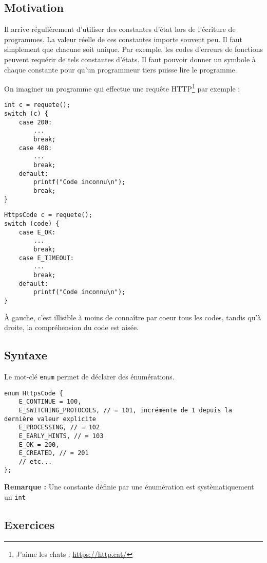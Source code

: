 \documentclass[../../../main.tex]{subfiles}
\begin{document}
\subsection{Motivation}
Il arrive régulièrement d'utiliser des constantes d'état lors de l'écriture de programmes. La valeur réelle de ces constantes importe souvent peu. Il faut simplement que chacune soit unique. Par exemple, les codes d'erreurs de fonctions peuvent requérir de tels constantes d'états. 
Il faut pouvoir donner un symbole à chaque constante pour qu'un programmeur tiers puisse lire le programme.

On imaginer un programme qui effectue une requête HTTP\footnote{J'aime les chats : \url{https://http.cat/}} par exemple :

\begin{minipage}{0.5\textwidth}
\begin{verbatim}
int c = requete();
switch (c) {
	case 200:
		...
		break;
	case 408:
		...
		break;
	default:
		printf("Code inconnu\n");
		break;
}
\end{verbatim}
\end{minipage}
\begin{minipage}{0.5\textwidth}
\begin{verbatim}
HttpsCode c = requete();
switch (code) {
	case E_OK:
		...
		break;
	case E_TIMEOUT:
		...
		break;
	default:
		printf("Code inconnu\n");
}
\end{verbatim}
\end{minipage}

À gauche, c'est illisible à moins de connaître par coeur tous les codes, tandis qu'à droite, la compréhension du code est aisée.
\subsection{Syntaxe}
Le mot-clé \texttt{enum} permet de déclarer des énumérations.

\begin{verbatim}
enum HttpsCode {
	E_CONTINUE = 100,
	E_SWITCHING_PROTOCOLS, // = 101, incrémente de 1 depuis la dernière valeur explicite
	E_PROCESSING, // = 102
	E_EARLY_HINTS, // = 103
	E_OK = 200,
	E_CREATED, // = 201
	// etc...
};
\end{verbatim}
\textbf{Remarque :} Une constante définie par une énumération est systèmatiquement un \texttt{int}
\subsection{Exercices}
\end{document}
